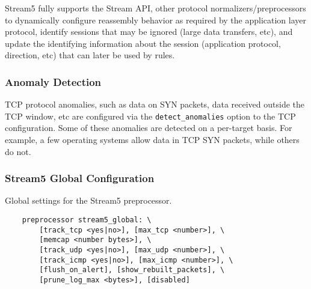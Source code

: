 \documentclass[english]{report}
\begin{document}
Stream5 fully supports the Stream API, other protocol normalizers/preprocessors to
dynamically configure reassembly behavior as required by the application layer
protocol, identify sessions that may be ignored (large data transfers, etc), and
update the identifying information about the session (application protocol, direction,
etc) that can later be used by rules.

\subsubsection{Anomaly Detection}

TCP protocol anomalies, such as data on SYN packets, data received outside the
TCP window, etc are configured via the \texttt{detect\_anomalies} option to the
TCP configuration.  Some of these anomalies are detected on a per-target basis.
For example, a few operating systems allow data in TCP SYN packets, while
others do not.

\subsubsection{Stream5 Global Configuration}

Global settings for the Stream5 preprocessor.

\begin{verbatim}
    preprocessor stream5_global: \
        [track_tcp <yes|no>], [max_tcp <number>], \
        [memcap <number bytes>], \
        [track_udp <yes|no>], [max_udp <number>], \
        [track_icmp <yes|no>], [max_icmp <number>], \
        [flush_on_alert], [show_rebuilt_packets], \
        [prune_log_max <bytes>], [disabled]
\end{verbatim}
\end{document}
